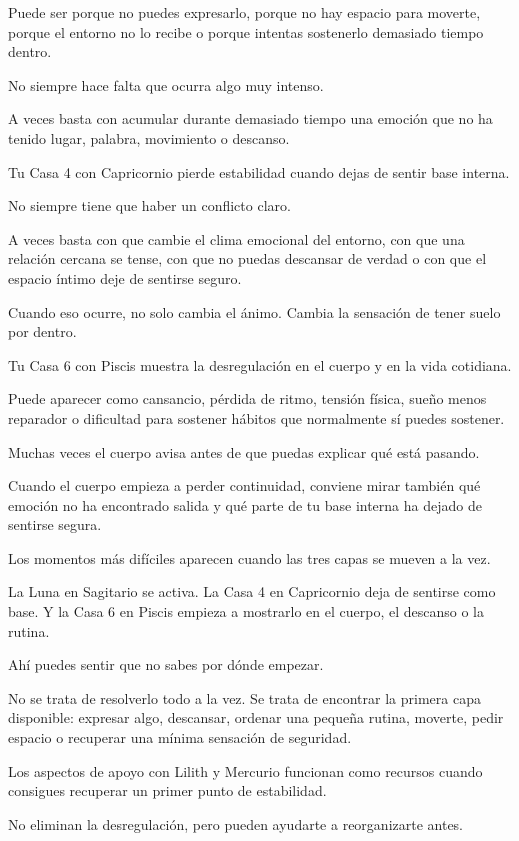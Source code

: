 \documentclass[11pt,a4paper]{article}
\begin{document}
Puede ser porque no puedes expresarlo, porque no hay espacio para moverte, porque el entorno no lo recibe o porque intentas sostenerlo demasiado tiempo dentro.

No siempre hace falta que ocurra algo muy intenso.

A veces basta con acumular durante demasiado tiempo una emoción que no ha tenido lugar, palabra, movimiento o descanso.

Tu Casa 4 con Capricornio pierde estabilidad cuando dejas de sentir base interna.

No siempre tiene que haber un conflicto claro.

A veces basta con que cambie el clima emocional del entorno, con que una relación cercana se tense, con que no puedas descansar de verdad o con que el espacio íntimo deje de sentirse seguro.

Cuando eso ocurre, no solo cambia el ánimo. Cambia la sensación de tener suelo por dentro.

Tu Casa 6 con Piscis muestra la desregulación en el cuerpo y en la vida cotidiana.

Puede aparecer como cansancio, pérdida de ritmo, tensión física, sueño menos reparador o dificultad para sostener hábitos que normalmente sí puedes sostener.

Muchas veces el cuerpo avisa antes de que puedas explicar qué está pasando.

Cuando el cuerpo empieza a perder continuidad, conviene mirar también qué emoción no ha encontrado salida y qué parte de tu base interna ha dejado de sentirse segura.

Los momentos más difíciles aparecen cuando las tres capas se mueven a la vez.

La Luna en Sagitario se activa.
La Casa 4 en Capricornio deja de sentirse como base.
Y la Casa 6 en Piscis empieza a mostrarlo en el cuerpo, el descanso o la rutina.

Ahí puedes sentir que no sabes por dónde empezar.

No se trata de resolverlo todo a la vez.
Se trata de encontrar la primera capa disponible: expresar algo, descansar, ordenar una pequeña rutina, moverte, pedir espacio o recuperar una mínima sensación de seguridad.

Los aspectos de apoyo con Lilith y Mercurio funcionan como recursos cuando consigues recuperar un primer punto de estabilidad.

No eliminan la desregulación, pero pueden ayudarte a reorganizarte antes.
\end{document}
